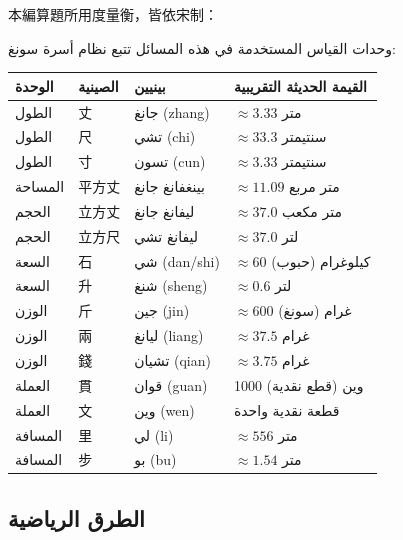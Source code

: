 \documentclass[11pt,a4paper]{article}
\begin{document}
\noindent
\begin{minipage}[t]{0.48\textwidth}
本編算題所用度量衡，皆依宋制：
\end{minipage}
\hfill
\begin{minipage}[t]{0.48\textwidth}
\arabicfont\beginR
وحدات القياس المستخدمة في هذه المسائل تتبع نظام أسرة سونغ:
\endR
\end{minipage}

\vspace{0.5em}

\begin{center}
\begin{longtable}{llll}
\toprule
\textbf{الوحدة} & \textbf{الصينية} & \textbf{بينيين} & \textbf{القيمة الحديثة التقريبية} \\
\midrule
\endfirsthead
الطول & 丈 & جانغ (zhang) & $\approx 3.33$ متر \\
الطول & 尺 & تشي (chi) & $\approx 33.3$ سنتيمتر \\
الطول & 寸 & تسون (cun) & $\approx 3.33$ سنتيمتر \\
المساحة & 平方丈 & بينغفانغ جانغ & $\approx 11.09$ متر مربع \\
الحجم & 立方丈 & ليفانغ جانغ & $\approx 37.0$ متر مكعب \\
الحجم & 立方尺 & ليفانغ تشي & $\approx 37.0$ لتر \\
السعة & 石 & شي (dan/shi) & $\approx 60$ كيلوغرام (حبوب) \\
السعة & 升 & شنغ (sheng) & $\approx 0.6$ لتر \\
الوزن & 斤 & جين (jin) & $\approx 600$ غرام (سونغ) \\
الوزن & 兩 & ليانغ (liang) & $\approx 37.5$ غرام \\
الوزن & 錢 & تشيان (qian) & $\approx 3.75$ غرام \\
العملة & 貫 & قوان (guan) & 1000 وين (قطع نقدية) \\
العملة & 文 & وين (wen) & قطعة نقدية واحدة \\
المسافة & 里 & لي (li) & $\approx 556$ متر \\
المسافة & 步 & بو (bu) & $\approx 1.54$ متر \\
\bottomrule
\end{longtable}
\end{center}

\subsection*{الطرق الرياضية}
\end{document}
